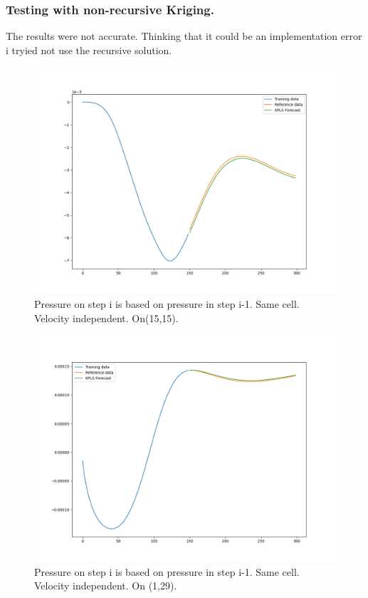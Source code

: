 \documentclass[xcolor=dvipsnames,10pt,aspectratio=169]{beamer}
\begin{document}
\begin{frame}\frametitle{Testing with non-recursive Kriging.}
	The results were not accurate. Thinking that it could be an implementation error i tryied not use the recursive solution.\\
	\begin{minipage}[h!]{0.49\textwidth}
		\begin{figure}
			\centering
			\includegraphics[clip=true, scale=0.25]{figuras/preassure_15_15_krigin_0.png}
	 		\caption{Pressure on step i is based on pressure in step i-1. Same cell. Velocity independent. On(15,15).}
		\end{figure}
	\end{minipage}
	\begin{minipage}[h!]{0.5\textwidth}
		\begin{figure}
			\centering
			\includegraphics[clip=true, scale=0.25]{figuras/preassure_1_29_krigin_0.png}
	 		\caption{Pressure on step i is based on pressure in step i-1. Same cell. Velocity independent. On (1,29).}
		\end{figure}
	\end{minipage}
\end{frame}
\end{document}
